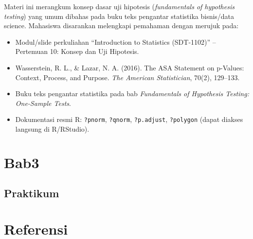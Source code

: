 \documentclass[
  indonesian,
  letterpaper,
]{book}
\providecommand{\tightlist}{%
  \setlength{\itemsep}{0pt}\setlength{\parskip}{0pt}}
\begin{document}
Materi ini merangkum konsep dasar uji hipotesis (\emph{fundamentals of
hypothesis testing}) yang umum dibahas pada buku teks pengantar
statistika bisnis/data science. Mahasiswa disarankan melengkapi
pemahaman dengan merujuk pada:

\begin{itemize}
\tightlist
\item
  Modul/slide perkuliahan ``Introduction to Statistics (SDT-1102)'' --
  Pertemuan 10: Konsep dan Uji Hipotesis.
\item
  Wasserstein, R. L., \& Lazar, N. A. (2016). The ASA Statement on
  p-Values: Context, Process, and Purpose. \emph{The American
  Statistician}, 70(2), 129--133.
\item
  Buku teks pengantar statistika pada bab \emph{Fundamentals of
  Hypothesis Testing: One-Sample Tests}.
\item
  Dokumentasi resmi R: \texttt{?pnorm}, \texttt{?qnorm},
  \texttt{?p.adjust}, \texttt{?polygon} (dapat diakses langsung di
  R/RStudio).
\end{itemize}


\chapter{Bab3}\label{bab3}

\section{Praktikum}\label{praktikum}


\chapter*{Referensi}\label{referensi}


\protect{}\label{refs}


\backmatter
\end{document}
